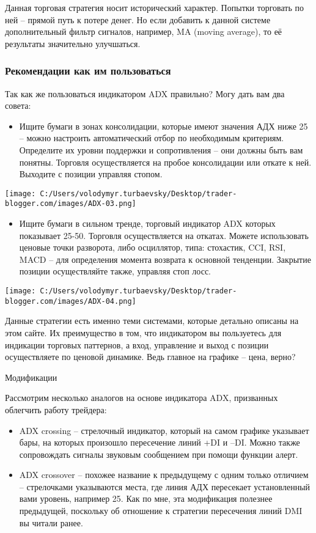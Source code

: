 \documentclass[a5paper]{article}
\begin{document}
Данная торговая стратегия носит исторический характер. Попытки
торговать по ней – прямой путь к потере денег. Но если добавить к
данной системе дополнительный фильтр сигналов, например, MA (moving
average), то её результаты значительно улучшаться.

\subsubsection{Рекомендации как им пользоваться}

Так как же пользоваться индикатором ADX правильно? Могу дать вам два совета:
\begin{itemize}
\item     Ищите бумаги в зонах консолидации, которые имеют значения АДХ ниже 25 – можно настроить автоматический отбор по необходимым критериям. Определите их уровни поддержки и сопротивления – они должны быть вам понятны. Торговля осуществляется на пробое консолидации или откате к ней. Выходите с позиции управляя стопом.
\end{itemize}

\texttt{[image: C:/Users/volodymyr.turbaevsky/Desktop/trader-blogger.com/images/ADX-03.png]}

\begin{itemize}
\item    Ищите бумаги в сильном тренде, торговый индикатор ADX которых
  показывает 25-50. Торговля осуществляется на откатах. Можете
  использовать ценовые точки разворота, либо осциллятор, типа:
  стохастик, CCI, RSI, MACD – для определения момента возврата к
  основной тенденции. Закрытие позиции осуществляйте также, управляя
  стоп лосс.
\end{itemize}

\texttt{[image: C:/Users/volodymyr.turbaevsky/Desktop/trader-blogger.com/images/ADX-04.png]}

Данные стратегии есть именно теми системами, которые детально описаны
на этом сайте. Их преимущество в том, что индикатором вы пользуетесь
для индикации торговых паттернов, а вход, управление и выход с позиции
осуществляете по ценовой динамике. Ведь главное на графике – цена,
верно?

Модификации

Рассмотрим несколько аналогов на основе индикатора ADX, призванных облегчить работу трейдера:
\begin{itemize}
\item     ADX crossing – стрелочный индикатор, который на самом графике указывает бары, на которых произошло пересечение линий +DI и –DI. Можно также сопровождать сигналы звуковым сообщением при помощи функции алерт.
\item     ADX crossover – похожее название к предыдущему с одним только отличием – стрелочками указываются места, где линия АДХ пересекает установленный вами уровень, например 25. Как по мне, эта модификация полезнее предыдущей, поскольку об отношение к стратегии пересечения линий DMI вы читали ранее.
\end{itemize}
\end{document}
